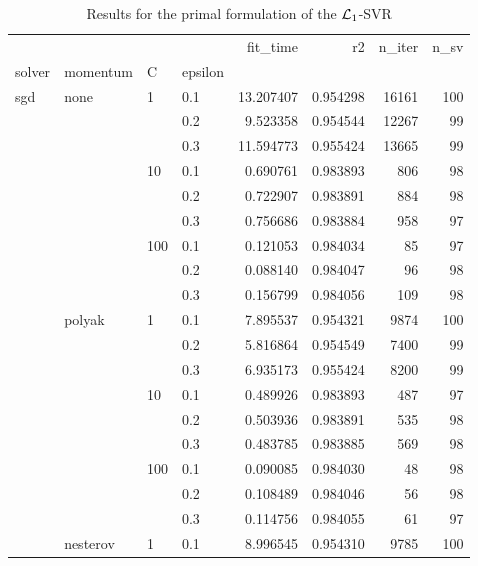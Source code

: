 \begin{table}[H]
\centering
\caption{Results for the primal formulation of the $\protect \mathcal{L}_1$-SVR}
\label{primal_l1_svr_cv_results}
\begin{tabular}{llllrrrr}
\toprule
          &   &     &     &   fit\_time &        r2 &  n\_iter &  n\_sv \\
solver & momentum & C & epsilon &            &           &         &       \\
\midrule
sgd & none & 1   & 0.1 &  13.207407 &  0.954298 &   16161 &   100 \\
          &   &     & 0.2 &   9.523358 &  0.954544 &   12267 &    99 \\
          &   &     & 0.3 &  11.594773 &  0.955424 &   13665 &    99 \\
          &   & 10  & 0.1 &   0.690761 &  0.983893 &     806 &    98 \\
          &   &     & 0.2 &   0.722907 &  0.983891 &     884 &    98 \\
          &   &     & 0.3 &   0.756686 &  0.983884 &     958 &    97 \\
          &   & 100 & 0.1 &   0.121053 &  0.984034 &      85 &    97 \\
          &   &     & 0.2 &   0.088140 &  0.984047 &      96 &    98 \\
          &   &     & 0.3 &   0.156799 &  0.984056 &     109 &    98 \\
          & polyak & 1   & 0.1 &   7.895537 &  0.954321 &    9874 &   100 \\
          &   &     & 0.2 &   5.816864 &  0.954549 &    7400 &    99 \\
          &   &     & 0.3 &   6.935173 &  0.955424 &    8200 &    99 \\
          &   & 10  & 0.1 &   0.489926 &  0.983893 &     487 &    97 \\
          &   &     & 0.2 &   0.503936 &  0.983891 &     535 &    98 \\
          &   &     & 0.3 &   0.483785 &  0.983885 &     569 &    98 \\
          &   & 100 & 0.1 &   0.090085 &  0.984030 &      48 &    98 \\
          &   &     & 0.2 &   0.108489 &  0.984046 &      56 &    98 \\
          &   &     & 0.3 &   0.114756 &  0.984055 &      61 &    97 \\
          & nesterov & 1   & 0.1 &   8.996545 &  0.954310 &    9785 &   100 \\

\end{tabular}
\end{table}
